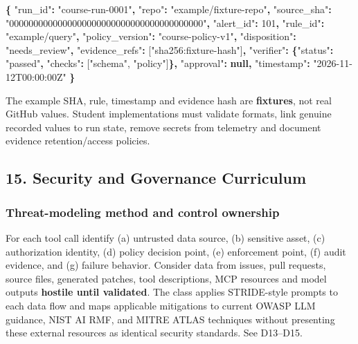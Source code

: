 \documentclass[
  10pt,
]{article}
\newenvironment{Shaded}{\begin{snugshade}}{\end{snugshade}}
\newcommand{\DataTypeTok}[1]{\textcolor[rgb]{0.13,0.29,0.53}{#1}}
\newcommand{\DecValTok}[1]{\textcolor[rgb]{0.00,0.00,0.81}{#1}}
\newcommand{\FunctionTok}[1]{\textcolor[rgb]{0.13,0.29,0.53}{\textbf{#1}}}
\newcommand{\KeywordTok}[1]{\textcolor[rgb]{0.13,0.29,0.53}{\textbf{#1}}}
\newcommand{\OtherTok}[1]{\textcolor[rgb]{0.56,0.35,0.01}{#1}}
\newcommand{\StringTok}[1]{\textcolor[rgb]{0.31,0.60,0.02}{#1}}
\begin{document}
\begin{Shaded}
\begin{Highlighting}[]
\FunctionTok{\{}
  \DataTypeTok{"run\_id"}\FunctionTok{:} \StringTok{"course{-}run{-}0001"}\FunctionTok{,}
  \DataTypeTok{"repo"}\FunctionTok{:} \StringTok{"example/fixture{-}repo"}\FunctionTok{,}
  \DataTypeTok{"source\_sha"}\FunctionTok{:} \StringTok{"0000000000000000000000000000000000000000"}\FunctionTok{,}
  \DataTypeTok{"alert\_id"}\FunctionTok{:} \DecValTok{101}\FunctionTok{,}
  \DataTypeTok{"rule\_id"}\FunctionTok{:} \StringTok{"example/query"}\FunctionTok{,}
  \DataTypeTok{"policy\_version"}\FunctionTok{:} \StringTok{"course{-}policy{-}v1"}\FunctionTok{,}
  \DataTypeTok{"disposition"}\FunctionTok{:} \StringTok{"needs\_review"}\FunctionTok{,}
  \DataTypeTok{"evidence\_refs"}\FunctionTok{:} \OtherTok{[}\StringTok{"sha256:fixture{-}hash"}\OtherTok{]}\FunctionTok{,}
  \DataTypeTok{"verifier"}\FunctionTok{:} \FunctionTok{\{}\DataTypeTok{"status"}\FunctionTok{:} \StringTok{"passed"}\FunctionTok{,} \DataTypeTok{"checks"}\FunctionTok{:} \OtherTok{[}\StringTok{"schema"}\OtherTok{,} \StringTok{"policy"}\OtherTok{]}\FunctionTok{\},}
  \DataTypeTok{"approval"}\FunctionTok{:} \KeywordTok{null}\FunctionTok{,}
  \DataTypeTok{"timestamp"}\FunctionTok{:} \StringTok{"2026{-}11{-}12T00:00:00Z"}
\FunctionTok{\}}
\end{Highlighting}
\end{Shaded}

The example SHA, rule, timestamp and evidence hash are
\textbf{fixtures}, not real GitHub values. Student implementations must
validate formats, link genuine recorded values to run state, remove
secrets from telemetry and document evidence retention/access policies.

\subsection{15. Security and Governance
Curriculum}\label{security-and-governance-curriculum}

\subsubsection{Threat-modeling method and control
ownership}\label{threat-modeling-method-and-control-ownership}

For each tool call identify (a) untrusted data source, (b) sensitive
asset, (c) authorization identity, (d) policy decision point, (e)
enforcement point, (f) audit evidence, and (g) failure behavior.
Consider data from issues, pull requests, source files, generated
patches, tool descriptions, MCP resources and model outputs
\textbf{hostile until validated}. The class applies STRIDE-style prompts
to each data flow and maps applicable mitigations to current OWASP LLM
guidance, NIST AI RMF, and MITRE ATLAS techniques without presenting
these external resources as identical security standards. See D13--D15.
\end{document}
